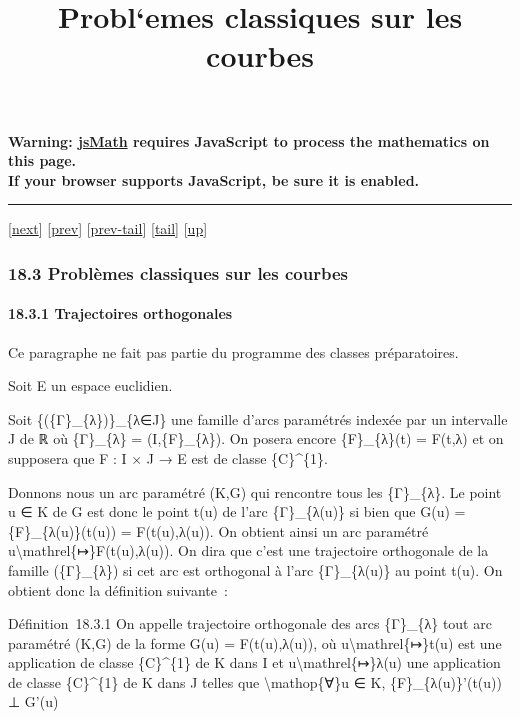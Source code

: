 \documentclass[]{article}
\title{Probl`emes classiques sur les courbes}
\author{}
\date{}
\begin{document}
\maketitle

\textbf{Warning: \href{http://www.math.union.edu/locate/jsMath}{jsMath}
requires JavaScript to process the mathematics on this page.\\ If your
browser supports JavaScript, be sure it is enabled.}

\begin{center}\rule{3in}{0.4pt}\end{center}

{[}\href{coursse99.html}{next}{]} {[}\href{coursse97.html}{prev}{]}
{[}\href{coursse97.html\#tailcoursse97.html}{prev-tail}{]}
{[}\hyperref[tailcoursse98.html]{tail}{]}
{[}\href{coursch19.html\#coursse98.html}{up}{]}

\subsubsection{18.3 Problèmes classiques sur les courbes}

\paragraph{18.3.1 Trajectoires orthogonales}

Ce paragraphe ne fait pas partie du programme des classes préparatoires.

Soit E un espace euclidien.

Soit \{(\{Γ\}\_\{λ\})\}\_\{λ∈J\} une famille d'arcs paramétrés indexée
par un intervalle J de ℝ où \{Γ\}\_\{λ\} = (I,\{F\}\_\{λ\}). On posera
encore \{F\}\_\{λ\}(t) = F(t,λ) et on supposera que F : I × J → E est de
classe \{C\}\^{}\{1\}.

Donnons nous un arc paramétré (K,G) qui rencontre tous les \{Γ\}\_\{λ\}.
Le point u ∈ K de G est donc le point t(u) de l'arc \{Γ\}\_\{λ(u)\} si
bien que G(u) = \{F\}\_\{λ(u)\}(t(u)) = F(t(u),λ(u)). On obtient ainsi
un arc paramétré u\textbackslash{}mathrel\{↦\}F(t(u),λ(u)). On dira que
c'est une trajectoire orthogonale de la famille (\{Γ\}\_\{λ\}) si cet
arc est orthogonal à l'arc \{Γ\}\_\{λ(u)\} au point t(u). On obtient
donc la définition suivante~:

Définition~18.3.1 On appelle trajectoire orthogonale des arcs
\{Γ\}\_\{λ\} tout arc paramétré (K,G) de la forme G(u) = F(t(u),λ(u)),
où u\textbackslash{}mathrel\{↦\}t(u) est une application de classe
\{C\}\^{}\{1\} de K dans I et u\textbackslash{}mathrel\{↦\}λ(u) une
application de classe \{C\}\^{}\{1\} de K dans J telles que
\textbackslash{}mathop\{∀\}u ∈ K, \{F\}\_\{λ(u)\}'(t(u)) ⊥ G'(u)
\end{document}
